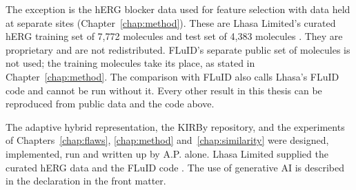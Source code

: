 The exception is the hERG blocker data used for feature selection with data held at separate sites (Chapter~\ref{chap:method}). These are Lhasa Limited's curated hERG training set of 7,772 molecules and test set of 4,383 molecules \citep{Hanser2025}. They are proprietary and are not redistributed. FLuID's separate public set of molecules is not used; the training molecules take its place, as stated in Chapter~\ref{chap:method}. The comparison with FLuID also calls Lhasa's FLuID code and cannot be run without it. Every other result in this thesis can be reproduced from public data and the code above.

The adaptive hybrid representation, the KIRBy repository, and the experiments of Chapters~\ref{chap:flaws}, \ref{chap:method} and~\ref{chap:similarity} were designed, implemented, run and written up by A.P. alone. Lhasa Limited supplied the curated hERG data and the FLuID code \citep{Hanser2025}. The use of generative AI is described in the declaration in the front matter.
